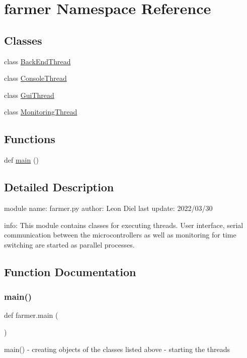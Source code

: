 \hypertarget{namespacefarmer}{}\section{farmer Namespace Reference}
\label{namespacefarmer}
\subsection*{Classes}
\begin{DoxyCompactItemize}
\item 
class \hyperlink{classfarmer_1_1BackEndThread}{Back\+End\+Thread}
\item 
class \hyperlink{classfarmer_1_1ConsoleThread}{Console\+Thread}
\item 
class \hyperlink{classfarmer_1_1GuiThread}{Gui\+Thread}
\item 
class \hyperlink{classfarmer_1_1MonitoringThread}{Monitoring\+Thread}
\end{DoxyCompactItemize}
\subsection*{Functions}
\begin{DoxyCompactItemize}
\item 
def \hyperlink{namespacefarmer_a0a14cc823bab0a0b696fc094bebdde61_a0a14cc823bab0a0b696fc094bebdde61}{main} ()
\end{DoxyCompactItemize}


\subsection{Detailed Description}
\begin{DoxyVerb}module name: farmer.py
author:      Leon Diel
last update: 2022/03/30

info:
    This module contains classes for executing threads. 
    User interface, serial communication between the microcontrollers as well as monitoring for time switching are started as parallel processes.
\end{DoxyVerb}
 

\subsection{Function Documentation}
\mbox{\label{namespacefarmer_a0a14cc823bab0a0b696fc094bebdde61_a0a14cc823bab0a0b696fc094bebdde61}} 
\subsubsection{\texorpdfstring{main()}{main()}}
{\footnotesize\ttfamily def farmer.\+main (\begin{DoxyParamCaption}{ }\end{DoxyParamCaption})}

\begin{DoxyVerb}main()
    - creating objects of the classes listed above
    - starting the threads
\end{DoxyVerb}
 